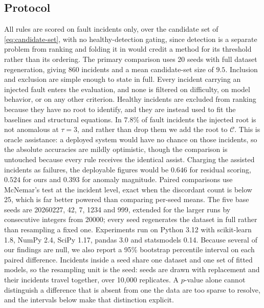\documentclass[conference]{IEEEtran}
\begin{document}
\subsection{Protocol}
All rules are scored on fault incidents only, over the candidate set of \eqref{eq:candidate-set}, with no healthy-detection gating, since detection is a separate problem from ranking and folding it in would credit a method for its threshold rather than its ordering. The primary comparison uses 20 seeds with full dataset regeneration, giving 860 incidents and a mean candidate-set size of $9.5$. Inclusion and exclusion are simple enough to state in full. Every incident carrying an injected fault enters the evaluation, and none is filtered on difficulty, on model behavior, or on any other criterion. Healthy incidents are excluded from ranking because they have no root to identify, and they are instead used to fit the baselines and structural equations. In $7.8\%$ of fault incidents the injected root is not anomalous at $\tau=3$, and rather than drop them we add the root to $\mathcal{C}$. This is oracle assistance: a deployed system would have no chance on those incidents, so the absolute accuracies are mildly optimistic, though the comparison is untouched because every rule receives the identical assist. Charging the assisted incidents as failures, the deployable figures would be $0.646$ for residual scoring, $0.524$ for ours and $0.393$ for anomaly magnitude. Paired comparisons use McNemar's test \cite{mcnemar1947} at the incident level, exact when the discordant count is below 25, which is far better powered than comparing per-seed means. The five base seeds are 20260227, 42, 7, 1234 and 999, extended for the larger runs by consecutive integers from 20000; every seed regenerates the dataset in full rather than resampling a fixed one. Experiments run on Python 3.12 with scikit-learn 1.8, NumPy 2.4, SciPy 1.17, pandas 3.0 and statsmodels 0.14. Because several of our findings are null, we also report a 95\% bootstrap percentile interval on each paired difference. Incidents inside a seed share one dataset and one set of fitted models, so the resampling unit is the seed: seeds are drawn with replacement and their incidents travel together, over 10{,}000 replicates. A $p$-value alone cannot distinguish a difference that is absent from one the data are too sparse to resolve, and the intervals below make that distinction explicit.
\end{document}
